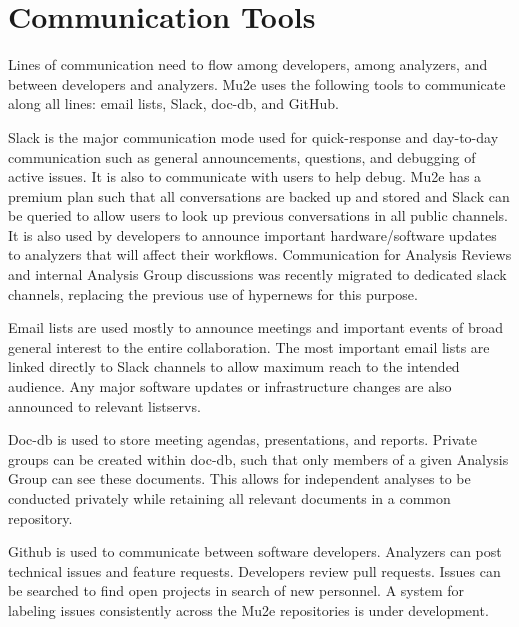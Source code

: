 \section{Communication Tools}
\label{sec:communication}

Lines of communication need to flow among developers, among analyzers, and between developers and analyzers. Mu2e uses the following tools to communicate along all lines: email lists, Slack, doc-db, and GitHub.

Slack is the major communication mode used for quick-response and day-to-day communication such as general announcements, questions, and debugging of active issues. It is also to communicate with users to help debug. Mu2e has a premium plan such that all conversations are backed up and stored and Slack can be queried to allow users to look up previous conversations in all public channels. It is also used by developers to announce important hardware/software updates to analyzers that will affect their workflows. Communication for Analysis Reviews and internal Analysis Group discussions was recently migrated to dedicated slack channels, replacing the previous use of hypernews for this purpose.

Email lists are used mostly to announce meetings and important events of broad general interest to the entire collaboration. The most important email lists are linked directly to Slack channels to allow maximum reach to the intended audience. Any major software updates or infrastructure changes are also announced to relevant listservs.

Doc-db is used to store meeting agendas, presentations, and reports. Private groups can be created within doc-db, such that only members of a given Analysis Group can see these documents. This allows for independent analyses to be conducted privately while retaining all relevant documents in a common repository. 

Github is used to communicate between software developers. Analyzers can post technical issues and feature requests. Developers review pull requests. Issues can be searched to find open projects in search of new personnel. A system for labeling issues consistently across the Mu2e repositories is under development.

